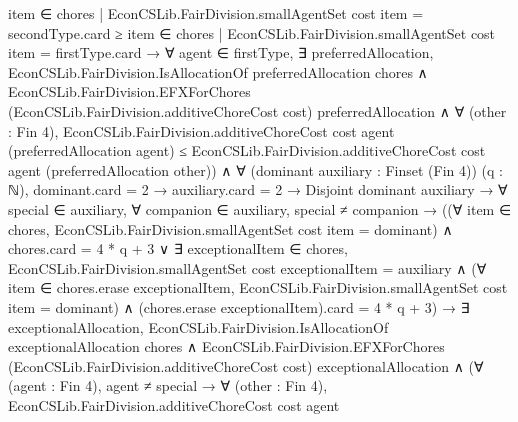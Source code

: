 \documentclass[10pt]{article}
\begin{document}
\begin{ReviewVerbatim}
                            {item ∈ chores | EconCSLib.FairDivision.smallAgentSet cost item = secondType}.card ≥
                                {item ∈ chores | EconCSLib.FairDivision.smallAgentSet cost item = firstType}.card →
                              ∀ agent ∈ firstType,
                                ∃ preferredAllocation,
                                  EconCSLib.FairDivision.IsAllocationOf preferredAllocation chores ∧
                                    EconCSLib.FairDivision.EFXForChores (EconCSLib.FairDivision.additiveChoreCost cost)
                                        preferredAllocation ∧
                                      ∀ (other : Fin 4),
                                        EconCSLib.FairDivision.additiveChoreCost cost agent
                                            (preferredAllocation agent) ≤
                                          EconCSLib.FairDivision.additiveChoreCost cost agent
                                            (preferredAllocation other)) ∧
                  ∀ (dominant auxiliary : Finset (Fin 4)) (q : ℕ),
                    dominant.card = 2 →
                      auxiliary.card = 2 →
                        Disjoint dominant auxiliary →
                          ∀ special ∈ auxiliary,
                            ∀ companion ∈ auxiliary,
                              special ≠ companion →
                                ((∀ item ∈ chores, EconCSLib.FairDivision.smallAgentSet cost item = dominant) ∧
                                      chores.card = 4 * q + 3 ∨
                                    ∃ exceptionalItem ∈ chores,
                                      EconCSLib.FairDivision.smallAgentSet cost exceptionalItem = auxiliary ∧
                                        (∀ item ∈ chores.erase exceptionalItem,
                                            EconCSLib.FairDivision.smallAgentSet cost item = dominant) ∧
                                          (chores.erase exceptionalItem).card = 4 * q + 3) →
                                  ∃ exceptionalAllocation,
                                    EconCSLib.FairDivision.IsAllocationOf exceptionalAllocation chores ∧
                                      EconCSLib.FairDivision.EFXForChores
                                          (EconCSLib.FairDivision.additiveChoreCost cost) exceptionalAllocation ∧
                                        (∀ (agent : Fin 4),
                                            agent ≠ special →
                                              ∀ (other : Fin 4),
                                                EconCSLib.FairDivision.additiveChoreCost cost agent

\end{ReviewVerbatim}
\end{document}
